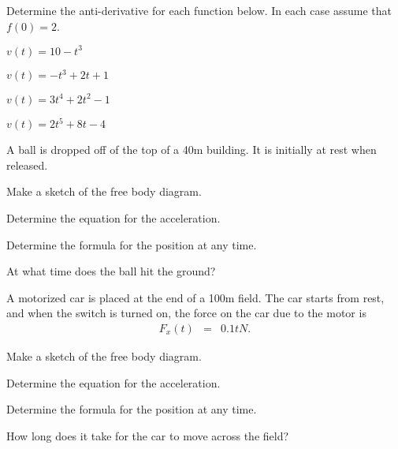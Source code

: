 
\begin{problem}
\item Determine the anti-derivative for each function below. In each
  case assume that $f(0)=2$.
  \begin{subproblem}
  \item $v(t)= 10 - t^3$
    \vfill
  \item $v(t)= -t^3+2t+1$
    \vfill
  \item $v(t)= 3 t^4 + 2 t^2 - 1$
    \vfill
  \item $v(t)= 2t^5 + 8t - 4$
    \vfill
  \end{subproblem}
\end{problem}


\begin{problem}
\item A ball is dropped off of the top of a 40m building. It is
  initially at rest when released.
  \begin{subproblem}
    \item Make a sketch of the free body diagram.
      \vspace{7em}
    \item Determine the equation for the acceleration.
      \vspace{5em}
    \item Determine the formula for the position at any time.
      \vfill
    \item At what time does the ball hit the ground?
      \vspace{5em}
  \end{subproblem}
  \clearpage
\item A motorized car is placed at the end of a 100m field. The car
  starts from rest, and when the switch is turned on, the force on the
  car due to the motor is
  \begin{eqnarray*}
    F_x(t) & = & 0.1 t N.
  \end{eqnarray*}
  \begin{subproblem}
    \item Make a sketch of the free body diagram.
      \vspace{7em}
    \item Determine the equation for the acceleration.
      \vspace{5em}
    \item Determine the formula for the position at any time.
      \vfill
    \item How long does it take for the car to move across the field?
      \vspace{5em}
  \end{subproblem}

\end{problem}

